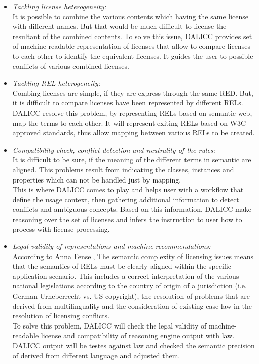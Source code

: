 \begin{itemize}
	\item \textit{Tackling license heterogeneity:} \\
	It is possible to combine the various contents which having the same license with different names. But that would be much difficult to license the resultant of the combined contents. To solve this issue, DALICC provides set of machine-readable representation of licenses that allow to compare licenses to each other to identify the equivalent licenses. It guides the user to possible conflicts of various combined licenses.
	\item \textit{Tackling REL heterogeneity:} \\
	Combing licenses are simple, if they are express through the same RED. But, it is difficult to compare licenses have been represented by different RELs.\\
	DALICC resolve this problem, by representing RELs based on semantic web, map the terms to each other. It will represent exiting RELs based on  W3C-approved standards, thus allow mapping between various RELs to be created.
	\item \textit{Compatibility check, conflict detection and neutrality of the rules:} \\
	It is difficult to be sure, if the meaning of the different terms in semantic are aligned. This problems result from indicating the classes, instances and properties which can not be handled just by mapping.\\
	This is where DALICC comes to play and helps user with a workflow that define the usage context, then gathering additional information to detect conflicts and ambiguous concepts. Based on this information, DALICC make reasoning over the set of licenses and infers the instruction to user how to process with license processing.\\
	\item \textit{Legal validity of representations and machine recommendations:} \\
	According to Anna Fensel\cite{Anna}, The semantic complexity of licensing issues means that the semantics of RELs must be clearly aligned within the specific application scenario. This includes a correct interpretation of the various national legislations according to the country of origin of a jurisdiction (i.e. German Urheberrecht vs. US copyright), the resolution of problems that are derived from multilinguality and the consideration of existing case law in the resolution of licensing conflicts.\cite{Anna}\\
	To solve this problem, DALICC will check the legal validity of machine-readable license and compatibility of reasoning engine output with law. DALICC output will be testes against law and checked the semantic precision of derived from different language and adjusted them.
	
\end{itemize}
